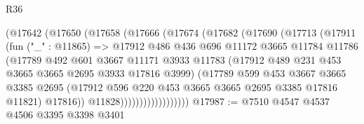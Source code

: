 \begin{lexlean}{R36}
\begin{coremodule}
                    (@17642
                      (@17650
                        (@17658
                          (@17666
                            (@17674
                              (@17682
                                (@17690
                                  (@17713
                                    (@17911
                                      (fun ("_" : @11865) =>
                                      @17912
                                        @486
                                        @436
                                        @696
                                        @11172
                                        @3665
                                        @11784
                                        @11786
                                        (@17789
                                          @492
                                          @601
                                          @3667
                                          @11171
                                          @3933
                                          @11783
                                          (@17912
                                            @489
                                            @231
                                            @453
                                            @3665
                                            @3665
                                            @2695
                                            @3933
                                            @17816
                                            @3999)
                                          (@17789
                                            @599
                                            @453
                                            @3667
                                            @3665
                                            @3385
                                            @2695
                                            (@17912
                                              @596
                                              @220
                                              @453
                                              @3665
                                              @3665
                                              @2695
                                              @3385
                                              @17816
                                              @11821)
                                            @17816))
                                        @11828))))))))))))))))))
@17987 := @7510 @4547 @4537 @4506 @3395 @3398 @3401

\end{coremodule}
\end{lexlean}
